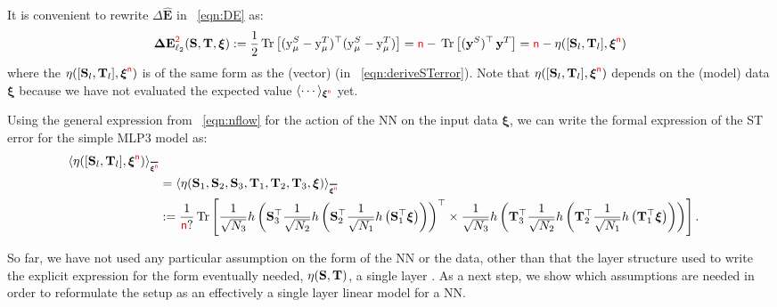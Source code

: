 It is convenient to rewrite $\Delta \mathbf{\hat{E}}$ in \EQN~\ref{eqn:DE} as:
\begin{align}
\label{eqn:DE2}
\mathbf{\Delta {E}}^{{\color{red}\sf{2}}}_{\ell_2}({\mathbf{S}},{\mathbf{T}}, \boldsymbol{\xi})
   := \frac{1}{2} \mbox{}\operatorname{Tr}\left[ (\mathrm{y}_{\mu}^{S} - \mathrm{y}_{\mu}^{T})^\top (\mathrm{y}_{\mu}^{S} - \mathrm{y}_{\mu}^{T}) \right]
   = {\color{red}\sf{n}} - \mbox{}\operatorname{Tr}\left[ (\mathbf{y}^{S})^{\top} \, \mathbf{y}^{T}  \right]
   = {\color{red}\sf{n}} - \eta([{\mathbf{S}}_l,{\mathbf{T}}_l],\boldsymbol{\xi}^{{\color{red}\sf{n}}})
\end{align}
where the \SelfOverlap $\eta([{\mathbf{S}}_l,{\mathbf{T}}_l],\boldsymbol{\xi}^{{\color{red}\sf{n}}})$
is of the same form as the (vector) \LinearPerceptron (in \EQN~\ref{eqn:deriveSTerror}).
Note that $\eta([{\mathbf{S}}_l,{\mathbf{T}}_l],\boldsymbol{\xi}^{{\color{red}\sf{n}}})$ depends on the (model) data $\boldsymbol{\xi}$
because we have not evaluated the expected value $\langle \cdots \rangle_{\boldsymbol{\xi}^{{\color{red}\sf{n}}}}$ yet.

Using the general expression from \EQN~\ref{eqn:nflow} for the action of the NN on the input data $\boldsymbol{\xi}$,
we can write the formal expression of the ST error for the simple MLP3 model as:
\begin{align}
\label{eqn:overlap1}
\ETAMLPAVG  \\ \nonumber
& =\langle\ETA(\SMAT_1,\SMAT_2,\SMAT_3,\TMAT_1,\TMAT_2,\TMAT_3,\boldsymbol{\xi})\rangle_{\AVGNDXI}  \\ \nonumber
& :=  \frac{1}{\ND ?}\Trace{
    \frac{1}{\sqrt{N_3}} h\left(\SMAT_3^{\top} 
    \frac{1}{\sqrt{N_2}} h\left(\SMAT_2^{\top} 
    \frac{1}{\sqrt{N_1}} h\left(\SMAT_1^{\top} \boldsymbol{\xi} \right)\right)\right)^{\top} 
    \times
    \frac{1}{\sqrt{N_3}} h\left(\TMAT_3^{\top} 
    \frac{1}{\sqrt{N_2}} h\left(\TMAT_2^{\top} 
    \frac{1}{\sqrt{N_1}} h\left(\TMAT_1^{\top} \boldsymbol{\xi} \right)\right)\right)
  }.
\end{align}

So far, we have not used any particular assumption on the form of the NN or the data, 
other than that the layer structure used to write the explicit expression for the form eventually needed,
$\eta({\mathbf{S}},{\mathbf{T}})$, a single layer \SelfOverlap.
As a next step, we show which assumptions are needed in order to reformulate the setup as
an effectively a single layer linear model for a NN.

